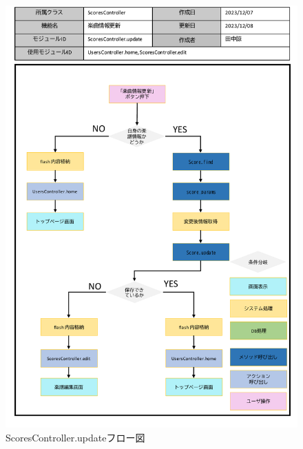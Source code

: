 \begin{figure}
	\centering
	\includegraphics[scale=0.6]{img/Scores/pptx/ScoresController_update.pdf}
	\caption{ScoresController.updateフロー図}
\end{figure}
\clearpage

